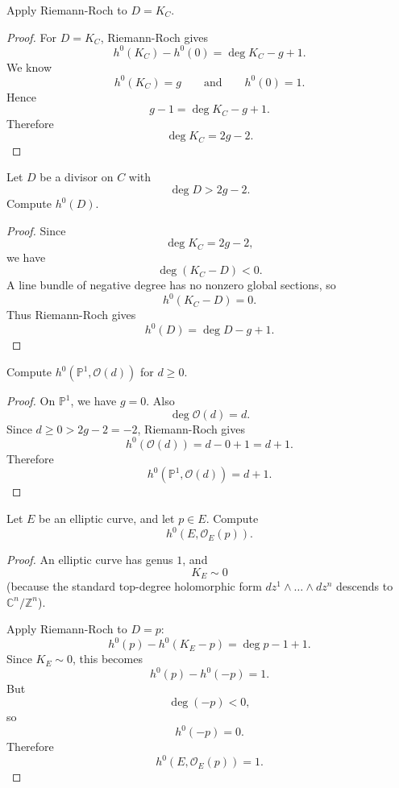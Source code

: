 \begin{exercise}
\label{exercise-riemann-roch-canonical}
Apply Riemann-Roch to $D=K_C$.
\end{exercise}

\begin{proof}
For $D=K_C$, Riemann-Roch gives
$$
  h^0(K_C)-h^0(0)
  =
  \deg K_C-g+1.
$$
We know
$$
  h^0(K_C)=g
  \qquad
  \text{and}
  \qquad
  h^0(0)=1.
$$
Hence
$$
  g-1=\deg K_C-g+1.
$$
Therefore
$$
  \deg K_C=2g-2.
$$
\end{proof}

\begin{exercise}
\label{exercise-high-degree-divisor}
Let $D$ be a divisor on $C$ with
$$
  \deg D>2g-2.
$$
Compute $h^0(D)$.
\end{exercise}

\begin{proof}
Since
$$
  \deg K_C=2g-2,
$$
we have
$$
  \deg(K_C-D)<0.
$$
A line bundle of negative degree has no
nonzero global sections, so
$$
  h^0(K_C-D)=0.
$$
Thus Riemann-Roch gives
$$
  h^0(D)=\deg D-g+1.
$$
\end{proof}

\begin{exercise}
\label{exercise-p1-sections}
Compute $h^0(\mathbb P^1,\mathcal O(d))$
for $d\geq 0$.
\end{exercise}

\begin{proof}
On $\mathbb P^1$, we have $g=0$.
Also
$$
  \deg \mathcal O(d)=d.
$$
Since $d\geq 0>2g-2=-2$, Riemann-Roch
gives
$$
  h^0(\mathcal O(d))
  =
  d-0+1
  =
  d+1.
$$
Therefore
$$
  h^0(\mathbb P^1,\mathcal O(d))=d+1.
$$
\end{proof}

\begin{exercise}
\label{exercise-elliptic-point}
Let $E$ be an elliptic curve, and let
$p\in E$. Compute
$$
  h^0(E,\mathcal O_E(p)).
$$
\end{exercise}

\begin{proof}
An elliptic curve has genus $1$, and
$$
  K_E\sim 0
$$
(because the standard top-degree
holomorphic form $dz^1 \wedge…\wedge dz^n$
descends to $\mathbb{C}^n/\mathbb{Z}^n$).

Apply Riemann-Roch to $D=p$:
$$
  h^0(p)-h^0(K_E-p)
  =
  \deg p-1+1.
$$
Since $K_E\sim 0$, this becomes
$$
  h^0(p)-h^0(-p)=1.
$$
But
$$
  \deg(-p)<0,
$$
so
$$
  h^0(-p)=0.
$$
Therefore
$$
  h^0(E,\mathcal O_E(p))=1.
$$
\end{proof}

